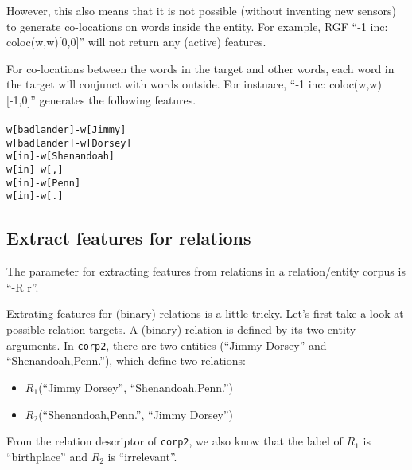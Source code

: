 \documentclass[11pt]{article}
\begin{document}
However, this also means that it is not possible (without inventing new sensors) to
generate co-locations on words inside the entity.  For example, RGF 
``-1 inc: coloc(w,w)[0,0]''
will not return any (active) features.

For co-locations between the words in the target and other words, each word in the
target will conjunct with words outside.  For instnace, 
``-1 inc: coloc(w,w)[-1,0]'' generates the following features. \\ \\
%
{\tt w[badlander]-w[Jimmy] \\
w[badlander]-w[Dorsey] \\
w[in]-w[Shenandoah] \\
w[in]-w[,] \\
w[in]-w[Penn] \\
w[in]-w[.] }

\subsection*{Extract features for relations}

The parameter for extracting features from relations in a relation/entity corpus is ``-R r''.

Extrating features for (binary) relations is a little tricky.  Let's first take a look at
possible relation targets.
%
A (binary) relation is defined by its two entity arguments.  In {\tt corp2}, there are 
two entities (``Jimmy Dorsey'' and ``Shenandoah,Penn.''), which define two relations:
\begin{itemize}
\item $R_1$(``Jimmy Dorsey'', ``Shenandoah,Penn.'')
\item $R_2$(``Shenandoah,Penn.'', ``Jimmy Dorsey'')
\end{itemize}

From the relation descriptor of {\tt corp2}, we also know that the label of $R_1$ is 
``birthplace'' and $R_2$ is ``irrelevant''. 
\end{document}

